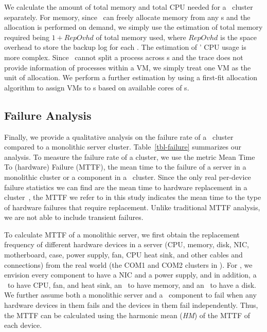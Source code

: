 We calculate the amount of total memory and total CPU needed for a \lego\ cluster separately.
For memory, since \lego\ can freely allocate memory from any \mcomponent{}s and the allocation is performed on demand, 
we simply use the estimation of total memory required being {\small{$1+RepOvhd$}} of total memory used,
where {\small{$RepOvhd$}} is the space overhead to store the backup log for each \mcomponent.
The estimation of \lego' CPU usage is more complex.
Since \lego\ cannot split a process across \pcomponent{}s and the trace does not provide information of 
processes within a VM, we simply treat one VM as the unit of allocation.
We perform a further estimation by using a first-fit allocation algorithm to assign VMs to \pcomponent{}s 
based on available cores of \pcomponent{}s.

\fi

\subsection{Failure Analysis}
\label{sec:failure-results}
Finally, we provide a qualitative analysis on the failure rate of a \lego\ cluster compared to a monolithic server cluster.
Table~\ref{tbl-failure} summarizes our analysis.
To measure the failure rate of a cluster, we use the metric Mean Time To (hardware) Failure (MTTF), 
the mean time to the failure of a server in a monolithic cluster
or a component in a \lego\ cluster.
Since the only real per-device failure statistics we can find are
the mean time to hardware replacement in a cluster~\cite{Failure-Disk-FAST07},
the MTTF we refer to in this study indicates the mean time to the type of 
hardware failures that require replacement.
Unlike traditional MTTF analysis, we are not able to include transient failures.

To calculate MTTF of a monolithic server, we first obtain the replacement frequency of different hardware devices in a server
(CPU, memory, disk, NIC, motherboard, case, power supply, fan, CPU heat sink, and other cables and connections)
from the real world (the COM1 and COM2 clusters in \cite{Failure-Disk-FAST07}).
For \lego, we envision every component to have a NIC and a power supply, 
and in addition, a \pcomponent\ to have CPU, fan, and heat sink, an \mcomponent\ to have memory, and an \scomponent\ to have a disk.
We further assume both a monolithic server and a \lego\ component to fail when any hardware devices in them fails
and the devices in them fail independently.
Thus, the MTTF can be calculated using the harmonic mean ({\em HM}) 
of the MTTF of each device.

